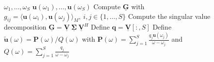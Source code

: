 \begin{algorithmic}
    \Require $\omega_1, \dots, \omega_S$ 
    \Require $\mathbf{u}(\omega_1), \dots, \mathbf{u}(\omega_S)$ 
    \State Compute $\mathbf{\underline{G}}$ with $g_{ij} = \langle \mathbf{u}(\omega_i), \mathbf{u}(\omega_j)\rangle_M,~ i, j \in \{1, \dots, S \}$ 
    \State Compute the singular value decomposition $\mathbf{\underline{G}} = \mathbf{\underline{V}}~\boldsymbol{\underline{\Sigma}}~\mathbf{\underline{V}}^H$
    \State Define $\mathbf{q} = \mathbf{\underline{V}}[:, S]$
    \State Define $\mathbf{\tilde{u}}(\omega) = \mathbf{P}(\omega) / Q(\omega)$ with $\mathbf{P}(\omega) = \sum_{j=1}^S \frac{q_j \mathbf{u}(\omega_j)}{\omega - \omega_j}$ and $Q(\omega) = \sum_{j=1}^S \frac{q_j}{\omega - \omega_j}$
\end{algorithmic}